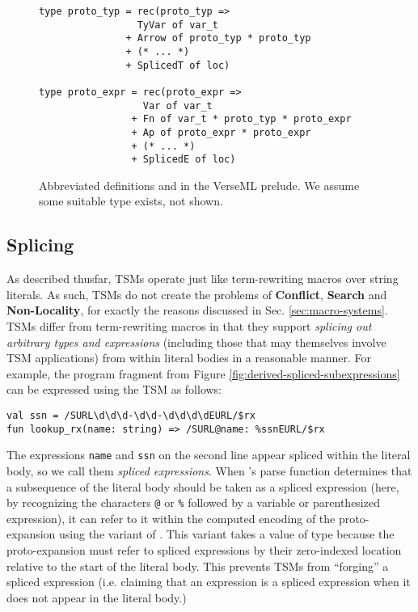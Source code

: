 \begin{figure}
\begin{lstlisting}[numbers=none]
type proto_typ = rec(proto_typ => 
                 TyVar of var_t 
               + Arrow of proto_typ * proto_typ 
               + (* ... *) 
               + SplicedT of loc)

type proto_expr = rec(proto_expr => 
                  Var of var_t 
                + Fn of var_t * proto_typ * proto_expr
                + Ap of proto_expr * proto_expr
                + (* ... *) 
                + SplicedE of loc)
\end{lstlisting}
\caption[Abbreviated definitions of  and  in VerseML]{Abbreviated definitions  and  in the VerseML prelude. We assume some suitable type  exists, not shown.}
\label{fig:candidate-exp-verseml}
\vspace{-5px}
\end{figure}


\subsection{Splicing}\label{sec:splicing-and-hygiene}
As described thusfar, TSMs operate just like term-rewriting macros over string literals. As such, TSMs do not create the problems of \textbf{Conflict}, \textbf{Search} and \textbf{Non-Locality}, for exactly the reasons discussed in Sec. \ref{sec:macro-systems}. TSMs differ from term-rewriting macros in that they support \emph{splicing out arbitrary types and expressions} (including those that may themselves involve TSM applications) from within literal bodies in a reasonable manner. For example, the program fragment from Figure \ref{fig:derived-spliced-subexpressions} can be expressed using the  TSM as follows:
\begin{lstlisting}[numbers=none]
val ssn = /SURL\d\d\d-\d\d-\d\d\d\dEURL/$rx 
fun lookup_rx(name: string) => /SURL@name: %ssnEURL/$rx 
\end{lstlisting}
The expressions \lstinline{name} and \lstinline{ssn} on the second line appear spliced within the literal body, so we call them \emph{spliced expressions}. When 's parse function determines that a subsequence of the literal body should be taken as a spliced expression (here, by recognizing the characters \lstinline{@} or \lstinline{%} followed by a variable or parenthesized expression), 
it can refer to it within the computed encoding of the proto-expansion using the  variant of . This variant takes a value of type  because the proto-expansion must refer to spliced expressions by their zero-indexed location relative to the start of the literal body. This prevents TSMs from ``forging'' a spliced expression (i.e. claiming that an expression is a spliced expression when it does not appear in the literal body.) 

